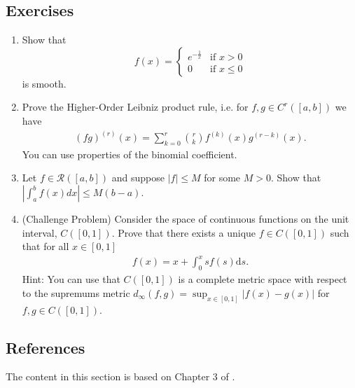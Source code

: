 \documentclass{article}
\begin{document}
\subsection{Exercises}
\begin{enumerate}
    \item Show that 
    \begin{equation*}
        f(x) = \begin{cases} e^{-\frac{1}{x}} & \text{if } x > 0 \\
        0 & \text{if } x \leq 0
        \end{cases}
    \end{equation*}
    is smooth.
    \item Prove the Higher-Order Leibniz product rule, i.e. for $f,g \in C^r([a,b])$ we have 
    \begin{align*}
        (fg)^{(r)}(x) = \sum_{k=0}^r \binom{r}{k} f^{(k)}(x) g^{(r-k)}(x).
    \end{align*}
    You can use properties of the binomial coefficient.
    \item Let $f \in \mathcal{R}([a,b])$ and suppose $|f| \leq M$ for some $M > 0$. Show that $|\int_a^b f(x) dx| \leq M(b-a)$.
    \item (Challenge Problem) Consider the space of continuous functions on the unit interval, $C([0,1])$. Prove that there exists a unique $f\in C([0,1])$ such that for all $x\in [0,1]$
    \begin{align*}
        f(x) = x + \int_0^x sf(s) \mathrm{d}s.
    \end{align*}
    Hint: You can use that $C([0,1])$ is a complete metric space with respect to the supremums metric $d_\infty (f,g) = \sup_{x\in [0,1]} \vert f(x) -g(x)\vert$ for $f,g \in C([0,1])$.
\end{enumerate}

\subsection{References}
The content in this section is based on Chapter 3 of \cite{realanalysis}.


\newpage

 

\end{document}
